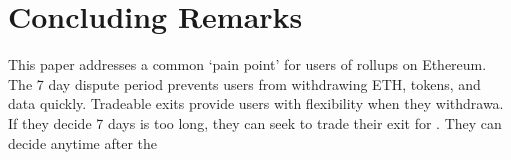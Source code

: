 \section{Concluding Remarks}

This paper addresses a common `pain point' for users of \layertwo rollups on Ethereum. The 7 day dispute period prevents users from withdrawing ETH, tokens, and data quickly. Tradeable exits provide users with flexibility when they withdrawa. If they decide 7 days is too long, they can seek to trade their exit for \ethone. They can decide anytime after the 






